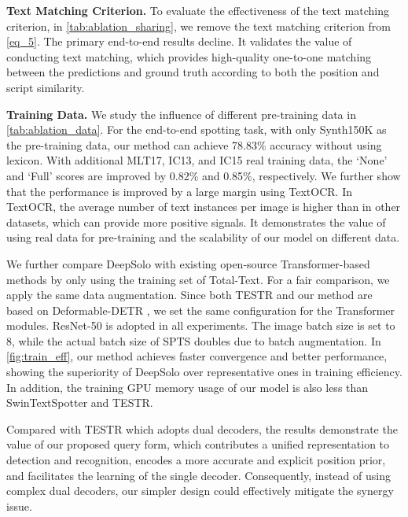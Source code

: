 \documentclass[10pt,twocolumn,letterpaper]{article}
\begin{document}
\noindent \textbf{Text Matching Criterion.} To evaluate the effectiveness of the text matching criterion, in \cref{tab:ablation_sharing}, we remove the text matching criterion from \cref{eq_5}. The primary end-to-end results decline. It validates the value of conducting text matching, which provides high-quality one-to-one matching between the predictions and ground truth according to both the position and script similarity.

\noindent \textbf{Training Data.} We study the influence of different pre-training data in \cref{tab:ablation_data}. For the end-to-end spotting task, with only Synth150K as the pre-training data, our method can achieve 78.83\% accuracy without using lexicon. With additional MLT17, IC13, and IC15 real training data, the `None' and `Full' scores are improved by 0.82\% and 0.85\%, respectively. We further show that the performance is improved by a large margin using TextOCR. In TextOCR, the average number of text instances per image is higher than in other datasets, which can provide more positive signals. It demonstrates the value of using real data for pre-training and the scalability of our model on different data. 


We further compare DeepSolo with existing open-source Transformer-based methods \cite{huang2022swintextspotter,zhang2022text,peng2022spts} by only using the training set of Total-Text. For a fair comparison, we apply the same data augmentation. Since both TESTR and our method are based on Deformable-DETR \cite{zhu2020deformable}, we set the same configuration for the Transformer modules. ResNet-50 \cite{he2016deep} is adopted in all experiments. The image batch size is set to 8, while the actual batch size of SPTS doubles due to batch augmentation. In \cref{fig:train_eff}, our method achieves faster convergence and better performance, showing the superiority of DeepSolo over representative ones in training efficiency. 
In addition, the training GPU memory usage of our model is also less than SwinTextSpotter and TESTR.

Compared with TESTR which adopts dual decoders, the results demonstrate the value of our proposed query form, which contributes a unified representation to detection and recognition, encodes a more accurate and explicit position prior, and facilitates the learning of the single decoder. Consequently, instead of using complex dual decoders, our simpler design could effectively mitigate the synergy issue.
\end{document}
